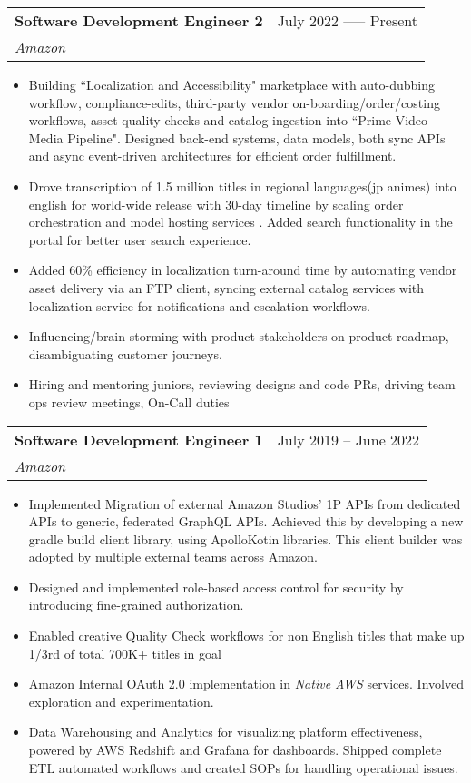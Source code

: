 \documentclass[letterpaper,11pt]{article}
\makeatletter
\newcommand{\resumeItem}[1]{
  \item\small{
    {#1 \vspace{-2pt}}
  }
}
\newcommand{\resumeSubheading}[4]{
  \vspace{-2pt}\item
    \begin{tabular*}{0.97\textwidth}[t]{l@{\extracolsep{\fill}}r}
      \textbf{#1} & #2 \\
      \textit{\small#3} & \textit{\small #4} \\
    \end{tabular*}\vspace{-7pt}
}
\newcommand{\resumeSubSubheading}[2]{
    \item
    \begin{tabular*}{0.97\textwidth}{l@{\extracolsep{\fill}}r}
      \textit{\small#1} & \textit{\small #2} \\
    \end{tabular*}\vspace{-7pt}
}
\newcommand{\resumeSubHeadingListEnd}{\end{itemize}}
\newcommand{\resumeItemListStart}{\begin{itemize}}
\newcommand{\resumeItemListEnd}{\end{itemize}\vspace{-5pt}}
\makeatother
\begin{document}
    \resumeSubheading
      {Software Development Engineer 2}{July 2022 ----- Present}
      {Amazon}{}
      \resumeItemListStart
        \resumeItem{Building ``Localization and Accessibility" marketplace with auto-dubbing workflow, compliance-edits, third-party vendor on-boarding/order/costing workflows, asset quality-checks and catalog ingestion into ``Prime Video Media Pipeline". Designed back-end systems, data models, both sync APIs and async event-driven architectures for efficient order fulfillment.}
        \resumeItem{Drove transcription of 1.5 million titles in regional languages(jp animes) into english for world-wide release with 30-day timeline by scaling order orchestration and model hosting services . Added search functionality in the portal for better user search experience.}
        \resumeItem{Added 60\% efficiency in localization turn-around time by automating vendor asset delivery via an FTP client, syncing external catalog services with localization service for notifications and escalation workflows.}
        \resumeItem{Influencing/brain-storming with product stakeholders on product roadmap, disambiguating customer journeys.}
        \resumeItem{Hiring and mentoring juniors, reviewing designs and code PRs, driving team ops review meetings, On-Call duties}
      \resumeItemListEnd
      

    \resumeSubheading
      {Software Development Engineer 1}{July 2019 -- June 2022}
      {Amazon}{}
      \resumeItemListStart
        \resumeItem{Implemented Migration of external Amazon Studios' 1P APIs from dedicated APIs to generic, federated GraphQL APIs. Achieved this by developing a new gradle build client library, using ApolloKotin libraries. This client builder was adopted by multiple external teams across Amazon.}
        \resumeItem{Designed and implemented role-based access control for security by introducing fine-grained authorization.}
        \resumeItem{Enabled creative Quality Check workflows for non English titles that make up 1/3rd of total 700K+ titles in goal}
        \resumeItem{Amazon Internal OAuth 2.0 implementation in \emph{Native AWS} services. Involved exploration and experimentation.}
        \resumeItem{Data Warehousing and Analytics for visualizing platform effectiveness, powered by AWS Redshift and Grafana for dashboards. Shipped complete ETL automated workflows and created SOPs for handling operational issues.}
    \resumeItemListEnd
\end{document}
